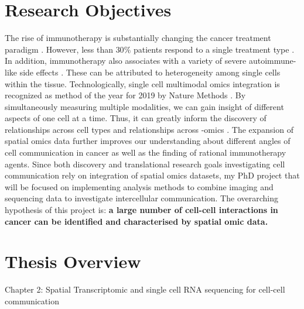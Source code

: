 \section{Research Objectives}
The rise of immunotherapy is substantially changing the cancer treatment paradigm \cite{dobosz2019intriguing}. However, less than $30\%$ patients respond to a single treatment type \cite{ott2017combination}. In addition, immunotherapy also associates with a variety of severe autoimmune-like side effects \cite{naidoo2015toxicities,bertrand2015immune}. These can be attributed to heterogeneity among single cells within the tissue. Technologically, single cell multimodal omics integration is recognized as method of the year for 2019 by Nature Methods \cite{teichmann2020method}. By simultaneously measuring multiple modalities, we can gain insight of different aspects of one cell at a time. Thus, it can greatly inform the discovery of relationships across cell types and relationships across -omics \cite{teichmann2020method}. The expansion of spatial omics data further improves our understanding about different angles of cell communication in cancer as well as the finding of rational immunotherapy agents. Since both discovery and translational research goals investigating cell communication rely on integration of spatial omics datasets, my PhD project that will be focused on implementing analysis methods to combine imaging and sequencing data to investigate intercellular communication.   
The overarching hypothesis of this project is: \textbf{a large number of cell-cell interactions in cancer can be identified and characterised by spatial omic data.}



\section{Thesis Overview}

Chapter 2: Spatial Transcriptomic and single cell RNA sequencing for cell-cell communication 

